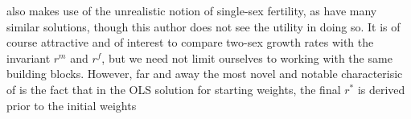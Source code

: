 \citet{mitra1978derivation} also makes use of the unrealistic
notion of single-sex fertility, as have many similar solutions, though this
author does not see the utility in doing so. It is of course attractive and of
interest to compare two-sex growth rates with the invariant $r^m$ and $r^f$, but
we need not limit ourselves to working with the same building blocks. However,
far and away the most novel and notable characterisic of
\citep{mitra1978derivation} is the fact that in the OLS solution for starting
weights, the final $r^\ast$ is derived prior to the initial weights







